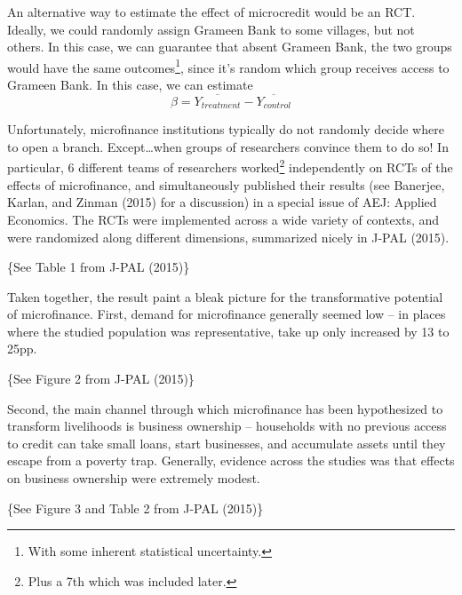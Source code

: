 \documentclass[12pt,english]{article}
\begin{document}
An alternative way to estimate the effect of microcredit would be an RCT. Ideally, we could randomly assign Grameen Bank to some villages, but not others. In this case, we can guarantee that absent Grameen Bank, the two groups would have the same outcomes\footnote{With some inherent statistical uncertainty.}, since it's random which group receives access to Grameen Bank. In this case, we can estimate
$$ \beta = \overline{Y_{treatment}} - \overline{Y_{control}} $$

Unfortunately, microfinance institutions typically do not randomly decide where to open a branch. Except\ldots when groups of researchers convince them to do so! In particular, 6 different teams of researchers worked\footnote{Plus a 7th which was included later.} independently on RCTs of the effects of microfinance, and simultaneously published their results (see Banerjee, Karlan, and Zinman (2015) for a discussion) in a special issue of AEJ: Applied Economics. The RCTs were implemented across a wide variety of contexts, and were randomized along different dimensions, summarized nicely in J-PAL (2015).

\begin{center}
\{See Table 1 from J-PAL (2015)\}
\end{center}

Taken together, the result paint a bleak picture for the transformative potential of microfinance. First, demand for microfinance generally seemed low -- in places where the studied population was representative, take up only increased by 13 to 25pp.

\begin{center}
	\{See Figure 2 from J-PAL (2015)\}
\end{center}

Second, the main channel through which microfinance has been hypothesized to transform livelihoods is business ownership -- households with no previous access to credit can take small loans, start businesses, and accumulate assets until they escape from a poverty trap. Generally, evidence across the studies was that effects on business ownership were extremely modest.

\begin{center}
	\{See Figure 3 and Table 2 from J-PAL (2015)\}
\end{center}
\end{document}
